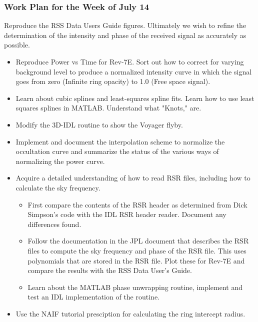 \documentclass[crop=false,class=article,oneside]{standalone}
\begin{document}
        \subsubsection{Work Plan for the Week of July 14}
            Reproduce the RSS Data Users Guide figures. Ultimately
            we wish to refine the determination of the intensity and
            phase of the received signal as accurately as possible.
            \begin{itemize}
                \item Reproduce Power vs Time for Rev-7E.
                      Sort out how to correct for varying background
                      level to produce a normalized intensity curve in
                      which the signal goes from zero (Infinite ring
                      opacity) to 1.0 (Free space signal).
                \item Learn about cubic splines and least-squares
                      spline fits. Learn how to use least squares
                      splines in MATLAB. Understand what "Knots," are.
                \item Modify the 3D-IDL routine to show the Voyager flyby.
                \item Implement and document the interpolation scheme
                      to normalize the occultation curve and summarize
                      the status of the various ways of normalizing the
                      power curve.
                \item Acquire a detailed understanding of how to
                      read RSR files, including how to calculate
                      the sky frequency.
                \begin{itemize}
                    \item First compare the contents of the RSR header
                          as determined from Dick Simpson's code with
                          the IDL RSR header reader. Document any
                          differences found.
                    \item Follow the documentation in the JPL document
                          that describes the RSR files to compute the
                          sky frequency and phase of the RSR file. This
                          uses polynomials that are stored in the RSR
                          file. Plot these for Rev-7E and compare the
                          results with the RSS Data User's Guide.
                    \item Learn about the MATLAB phase unwrapping
                          routine, implement and test an IDL
                          implementation of the routine.
                \end{itemize}
                \item Use the NAIF tutorial presciption for
                      calculating the ring intercept radius.
            \end{itemize}
\end{document}
